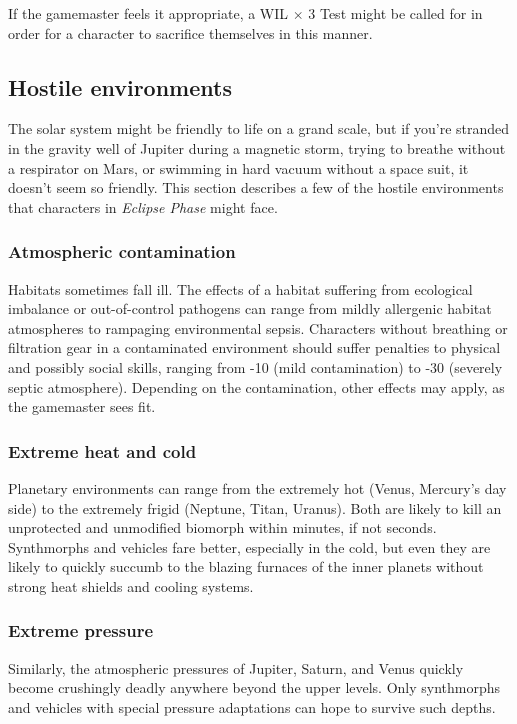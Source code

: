If the gamemaster feels it appropriate, a WIL $\times$ 3 Test might be called for in order for a character to sacrifice themselves in this manner.

\subsection{Hostile environments}
\label{sec:hostile-environments} The solar system might be friendly to life on a grand scale, but if you’re stranded in the gravity well of Jupiter during a magnetic storm, trying to breathe without a respirator on Mars, or swimming in hard vacuum without a space suit, it doesn’t seem so friendly. This section describes a few of the hostile environments that characters in \emph{Eclipse Phase} might face.

\subsubsection{Atmospheric contamination}

Habitats sometimes fall ill. The effects of a habitat suffering from ecological imbalance or out-of-control pathogens can range from mildly allergenic habitat atmospheres to rampaging environmental sepsis. Characters without breathing or filtration gear in a contaminated environment should suffer penalties to physical and possibly social skills, ranging from -10 (mild contamination) to -30 (severely septic atmosphere). Depending on the contamination, other effects may apply, as the gamemaster sees fit.

\subsubsection{Extreme heat and cold}

Planetary environments can range from the extremely hot (Venus, Mercury’s day side) to the extremely frigid (Neptune, Titan, Uranus). Both are likely to kill an unprotected and unmodified biomorph within minutes, if not seconds. Synthmorphs and vehicles fare better, especially in the cold, but even they are likely to quickly succumb to the blazing furnaces of the inner planets without strong heat shields and cooling systems.

\subsubsection{Extreme pressure}

Similarly, the atmospheric pressures of Jupiter, Saturn, and Venus quickly become crushingly deadly anywhere beyond the upper levels. Only synthmorphs and vehicles with special pressure adaptations can hope to survive such depths.

